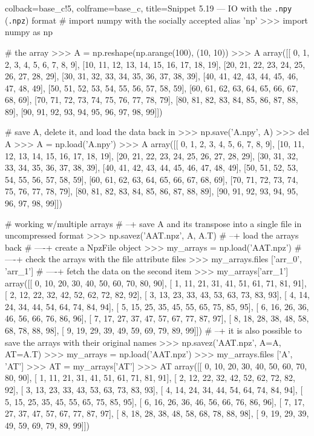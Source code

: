 \documentclass[a4paper,11pt]{book}
\begin{document}
\begin{pythoncode}[linenos=true,]{colback=base_c!5, colframe=base_c, title=\sffamily Snippet 5.19 --- IO with the \texttt{.npy} (\texttt{.npz}) format}
# import numpy with the socially accepted alias 'np'
>>> import numpy as np

# the array
>>> A = np.reshape(np.arange(100), (10, 10))
>>> A
array([[ 0,  1,  2,  3,  4,  5,  6,  7,  8,  9],
       [10, 11, 12, 13, 14, 15, 16, 17, 18, 19],
       [20, 21, 22, 23, 24, 25, 26, 27, 28, 29],
       [30, 31, 32, 33, 34, 35, 36, 37, 38, 39],
       [40, 41, 42, 43, 44, 45, 46, 47, 48, 49],
       [50, 51, 52, 53, 54, 55, 56, 57, 58, 59],
       [60, 61, 62, 63, 64, 65, 66, 67, 68, 69],
       [70, 71, 72, 73, 74, 75, 76, 77, 78, 79],
       [80, 81, 82, 83, 84, 85, 86, 87, 88, 89],
       [90, 91, 92, 93, 94, 95, 96, 97, 98, 99]])

# save A, delete it, and load the data back in
>>> np.save('A.npy', A)
>>> del A
>>> A = np.load('A.npy')
>>> A
array([[ 0,  1,  2,  3,  4,  5,  6,  7,  8,  9],
       [10, 11, 12, 13, 14, 15, 16, 17, 18, 19],
       [20, 21, 22, 23, 24, 25, 26, 27, 28, 29],
       [30, 31, 32, 33, 34, 35, 36, 37, 38, 39],
       [40, 41, 42, 43, 44, 45, 46, 47, 48, 49],
       [50, 51, 52, 53, 54, 55, 56, 57, 58, 59],
       [60, 61, 62, 63, 64, 65, 66, 67, 68, 69],
       [70, 71, 72, 73, 74, 75, 76, 77, 78, 79],
       [80, 81, 82, 83, 84, 85, 86, 87, 88, 89],
       [90, 91, 92, 93, 94, 95, 96, 97, 98, 99]])

# working w/multiple arrays
# --+ save A and its transpose into a single file in uncompressed format
>>> np.savez('AAT.npz', A, A.T)
# --+ load the arrays back
# ----+ create a NpzFile object
>>> my_arrays = np.load('AAT.npz')
# ----+ check the arrays with the file attribute files
>>> my_arrays.files
['arr_0', 'arr_1']
# ----+ fetch the data on the second item 
>>> my_arrays['arr_1']
array([[ 0, 10, 20, 30, 40, 50, 60, 70, 80, 90],
       [ 1, 11, 21, 31, 41, 51, 61, 71, 81, 91],
       [ 2, 12, 22, 32, 42, 52, 62, 72, 82, 92],
       [ 3, 13, 23, 33, 43, 53, 63, 73, 83, 93],
       [ 4, 14, 24, 34, 44, 54, 64, 74, 84, 94],
       [ 5, 15, 25, 35, 45, 55, 65, 75, 85, 95],
       [ 6, 16, 26, 36, 46, 56, 66, 76, 86, 96],
       [ 7, 17, 27, 37, 47, 57, 67, 77, 87, 97],
       [ 8, 18, 28, 38, 48, 58, 68, 78, 88, 98],
       [ 9, 19, 29, 39, 49, 59, 69, 79, 89, 99]])
# --+ it is also possible to save the arrays with their original names
>>> np.savez('AAT.npz', A=A, AT=A.T)
>>> my_arrays = np.load('AAT.npz')
>>> my_arrays.files
['A', 'AT']
>>> AT = my_arrays['AT']
>>> AT
array([[ 0, 10, 20, 30, 40, 50, 60, 70, 80, 90],
       [ 1, 11, 21, 31, 41, 51, 61, 71, 81, 91],
       [ 2, 12, 22, 32, 42, 52, 62, 72, 82, 92],
       [ 3, 13, 23, 33, 43, 53, 63, 73, 83, 93],
       [ 4, 14, 24, 34, 44, 54, 64, 74, 84, 94],
       [ 5, 15, 25, 35, 45, 55, 65, 75, 85, 95],
       [ 6, 16, 26, 36, 46, 56, 66, 76, 86, 96],
       [ 7, 17, 27, 37, 47, 57, 67, 77, 87, 97],
       [ 8, 18, 28, 38, 48, 58, 68, 78, 88, 98],
       [ 9, 19, 29, 39, 49, 59, 69, 79, 89, 99]])

\end{pythoncode}
\end{document}
